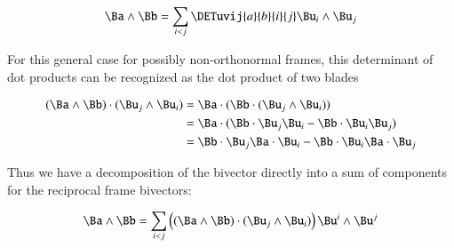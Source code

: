 \begin{equation}
\Ba \wedge \Bb = \sum_{i<j} \DETuvij{a}{b}{i}{j} \Bu_i \wedge \Bu_j
\end{equation}

For this general case for possibly non-orthonormal frames, this 
determinant of dot products can be recognized as the dot product of two blades

\begin{align*}
( \Ba \wedge \Bb ) \cdot (\Bu_j \wedge \Bu_i)
&= \Ba \cdot (\Bb \cdot (\Bu_j \wedge \Bu_i)) \\
&= \Ba \cdot (\Bb \cdot \Bu_j \Bu_i - \Bb \cdot \Bu_i \Bu_j) \\
&= \Bb \cdot \Bu_j \Ba \cdot \Bu_i - \Bb \cdot \Bu_i \Ba \cdot \Bu_j \\
\end{align*}

Thus we have a decomposition of the bivector directly into a sum of components
for the reciprocal frame bivectors:

\begin{equation}
\Ba \wedge \Bb
= \sum_{i<j} \left((\Ba \wedge \Bb) \cdot (\Bu_j \wedge \Bu_i) \right) \Bu^i \wedge \Bu^j
\end{equation}

